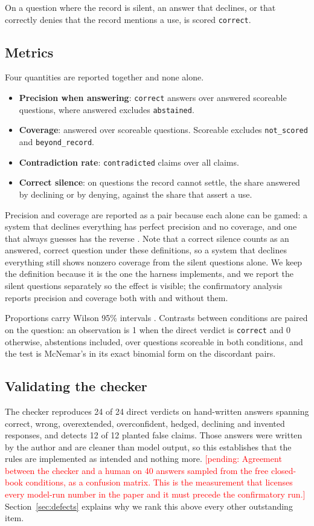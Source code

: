 \documentclass[11pt,a4paper]{article}
\newcommand{\pending}[1]{\textcolor{red}{[pending: #1]}}
\newcommand{\vt}[1]{\texttt{#1}}          %
\begin{document}
On a question where the record is silent, an answer that declines, or that correctly
denies that the record mentions a use, is scored \vt{correct}.

\subsection{Metrics}
Four quantities are reported together and none alone.
\begin{itemize}
  \item \textbf{Precision when answering}: \vt{correct} answers over answered
        scoreable questions, where answered excludes \vt{abstained}.
  \item \textbf{Coverage}: answered over scoreable questions. Scoreable excludes
        \vt{not\_scored} and \vt{beyond\_record}.
  \item \textbf{Contradiction rate}: \vt{contradicted} claims over all claims.
  \item \textbf{Correct silence}: on questions the record cannot settle, the share
        answered by declining or by denying, against the share that assert a use.
\end{itemize}
Precision and coverage are reported as a pair because each alone can be gamed: a
system that declines everything has perfect precision and no coverage, and one that
always guesses has the reverse \citep{elyaniv2010selective}. Note that a correct
silence counts as an answered, correct question under these definitions, so a system
that declines everything still shows nonzero coverage from the silent questions
alone. We keep the definition because it is the one the harness implements, and we
report the silent questions separately so the effect is visible; the confirmatory
analysis reports precision and coverage both with and without them.

Proportions carry Wilson 95\% intervals \citep{wilson1927}. Contrasts between
conditions are paired on the question: an observation is 1 when the direct verdict is
\vt{correct} and 0 otherwise, abstentions included, over questions scoreable in both
conditions, and the test is McNemar's \citep{mcnemar1947} in its exact binomial form
on the discordant pairs.

\subsection{Validating the checker}\label{sec:checker}
The checker reproduces 24 of 24 direct verdicts on hand-written answers spanning
correct, wrong, overextended, overconfident, hedged, declining and invented
responses, and detects 12 of 12 planted false claims. Those answers were written by
the author and are cleaner than model output, so this establishes that the rules are
implemented as intended and nothing more. \pending{Agreement between the checker and
a human on 40 answers sampled from the free closed-book conditions, as a confusion
matrix. This is the measurement that licenses every model-run number in the paper and
it must precede the confirmatory run.} Section~\ref{sec:defects} explains why we rank
this above every other outstanding item.
\end{document}

